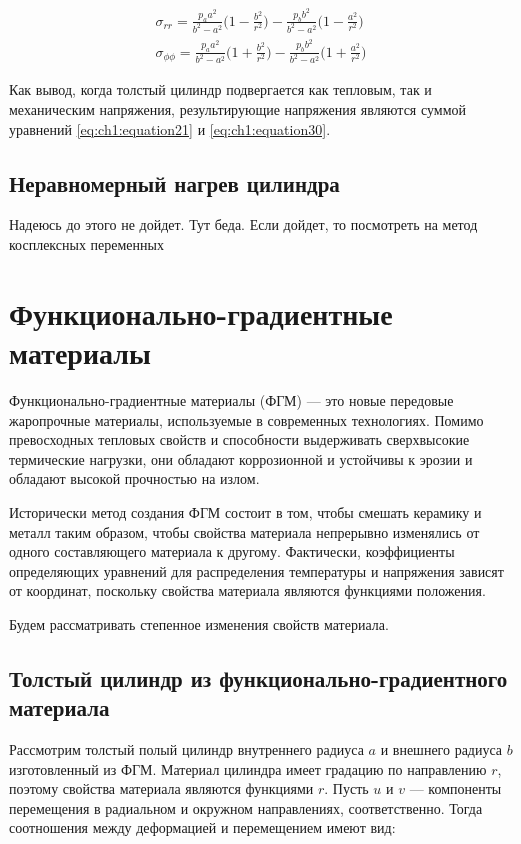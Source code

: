 \begin{equation}
	\label{eq:ch1:equation30}
	\begin{split}
		\sigma_{rr} = \frac{p_a a^2}{b^2 - a^2} \big (1-\frac{b^2}{r^2} \big )- \frac{p_b b^2}{b^2-a^2} \big (1 - \frac{a^2}{r^2} \big )\\
		\sigma_{\phi\phi} = \frac{p_a a^2}{b^2 - a^2} \big (1+\frac{b^2}{r^2} \big )- \frac{p_b b^2}{b^2-a^2} \big (1 + \frac{a^2}{r^2} \big )
	\end{split}
\end{equation}

Как вывод, когда толстый цилиндр подвергается как тепловым, так и механическим напряжения, результирующие напряжения являются суммой уравнений \cref{eq:ch1:equation21} и \cref{eq:ch1:equation30}.

\section{Неравномерный нагрев цилиндра}
\label{sec:ch1/sec2}
Надеюсь до этого не дойдет. Тут беда. 
Если дойдет, то посмотреть на метод косплексных переменных 

\chapter{Функционально-градиентные материалы}\label{ch:ch2}

Функционально-градиентные материалы (ФГМ) --- это новые передовые жаропрочные материалы, используемые в современных технологиях. Помимо превосходных тепловых свойств и способности выдерживать сверхвысокие термические нагрузки, они обладают коррозионной и
устойчивы к эрозии и обладают высокой прочностью на излом.


Исторически метод создания ФГМ состоит в том, чтобы смешать керамику и металл таким образом, чтобы свойства материала непрерывно изменялись от одного составляющего материала к другому. Фактически, коэффициенты определяющих уравнений для распределения температуры и напряжения зависят от координат, поскольку свойства материала являются функциями положения.

Будем рассматривать степенное изменения свойств материала.

\section{Толстый цилиндр из функционально-градиентного материала} \label{ch:ch2/sec1}

Рассмотрим толстый полый цилиндр внутреннего радиуса \(a\) и внешнего радиуса \(b\) изготовленный из ФГМ. Материал цилиндра имеет градацию по направлению \(r\), поэтому свойства материала являются функциями \(r\). Пусть \(u\) и \(v\) --- компоненты перемещения в радиальном и окружном направлениях, соответственно. Тогда соотношения между деформацией и перемещением имеют вид:


